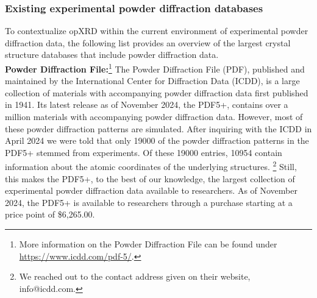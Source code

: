 

\pagebreak

\subsubsection*{Existing experimental powder diffraction databases}
To contextualize opXRD within the current environment of experimental powder diffraction data, the following list provides an overview of the largest crystal structure databases that include powder diffraction data.  \\

\textbf{Powder Diffraction File:}\footnote{More information on the Powder Diffraction File can be found under \url{https://www.icdd.com/pdf-5/}.} The Powder Diffraction File (PDF), published and maintained by the International Center for Diffraction Data (ICDD), is a large collection of materials with accompanying powder diffraction data first published in 1941. \cite{GatesRector2019} Its latest release as of November 2024, the PDF5+, contains over a million materials with accompanying powder diffraction data. However, most of these powder diffraction patterns are simulated. After inquiring with the ICDD in April 2024 we were told that only 19000 of the powder diffraction patterns in the PDF5+ stemmed from experiments. Of these 19000 entries, 10954 contain information about the atomic coordinates of the underlying structures. \footnote{We reached out to the contact address given on their website, info@icdd.com.} Still, this makes the PDF5+, to the best of our knowledge, the largest collection of experimental powder diffraction data available to researchers. As of November 2024, the PDF5+ is available to researchers through a purchase starting at a price point of \$6,265.00.\\

